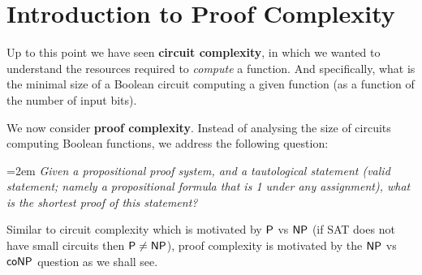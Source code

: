 \chapter{Introduction to Proof Complexity}

Up to this point we have  seen \textbf{circuit complexity}, in which we wanted to understand the resources required to \emph{compute} a function. And specifically, what is the minimal size of a Boolean circuit computing a given function (as a function of the number of input bits).

We now consider \textbf{proof complexity}. Instead of analysing the size of circuits computing Boolean
functions, we address the following question:



\bigskip

\noindent
\hangindent=2em
{\it Given a propositional proof system, and a tautological
statement (valid statement; namely a propositional
formula that is 1 under any assignment), what is the
shortest proof of this statement?
}
\bigskip


Similar to circuit complexity which is motivated by $\P$ vs $\NP$ (if SAT
does not have small circuits then $\P \neq \NP$), proof
complexity is motivated by the $\NP$ vs $\coNP$ question as we shall see.

